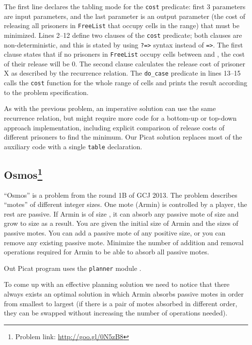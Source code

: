 \documentclass{llncs}
\begin{document}
The first line declares the tabling mode for the \texttt{cost} predicate: first 3 parameters are input parameters, and the last parameter is an output parameter
(the cost of releasing all prisoners in \texttt{FreeList} that occupy cells in the  range) that must be minimized.
Lines 2--12 define two clauses of the \texttt{cost} predicate; both clauses are non-deterministic, and this is stated by using \texttt{?=>} syntax instead of \texttt{=>}.
The first clause states that if no prisoners in \texttt{FreeList} occupy cells between  and , the cost of their release will be 0.
The second clause calculates the release cost of prisoner X as described by the recurrence relation.
The \texttt{do\_case} predicate in lines 13--15 calls the \texttt{cost} function for the whole range of cells and prints the result according to the problem specification.

As with the previous problem, an imperative solution can use the same recurrence relation, but might require more code for a bottom-up or top-down approach implementation, including explicit comparison of release costs of different prisoners to find the minimum. Our Picat solution replaces most of the auxiliary code with a single \texttt{table} declaration.

\subsection*{Osmos\footnote{Problem link: \url{http://goo.gl/0N5zB8}}}

``Osmos'' is a problem from the round 1B of GCJ 2013.
The problem describes ``motes'' of different integer sizes. One mote (Armin) is controlled by a player, the rest are passive. If Armin is of size , it can absorb any passive mote of size  and grow to size  as a result. You are given the initial size of Armin and the sizes of passive motes. You can add a passive mote of any positive size, or you can remove any existing passive mote. Minimize the number of addition and removal operations required for Armin to be able to absorb all passive motes.

Out Picat program uses the \texttt{planner} module \cite{zhou2014planning}.

To come up with an effective planning solution we need to notice that there always exists an optimal solution in which Armin absorbs passive motes in order from smallest to largest (if there is a pair of motes absorbed in different order, they can be swapped without increasing the number of operations needed).
\end{document}
